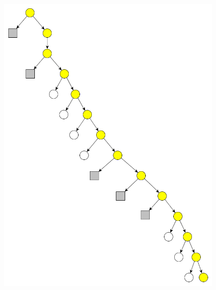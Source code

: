 \begin{figure}[h!]
{    \includegraphics[scale=0.15]{pictures/cluster_visualisation_algorithm_2.png}
    \label{fig:cluster_visualisation_algorithm_2}
}
\end{figure}
